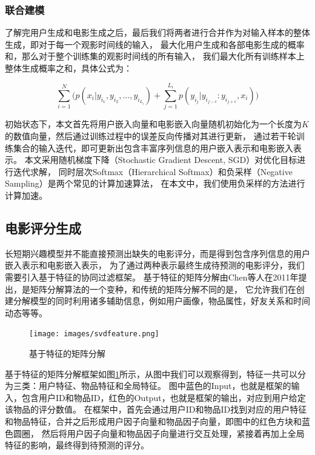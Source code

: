 \subsubsection{联合建模}
了解完用户生成和电影生成之后，最后我们将两者进行合并作为对输入样本的整体生成，即对于每一个观影时间线的输入，
最大化用户生成和各部电影生成的概率和，那么对于整个训练集的观影时间线的所有输入，
我们最大化所有训练样本上整体生成概率之和，具体公式为：

\begin{equation}
\sum_{i=1}^{N} \bigg( p(x_i | y_{i_1}, y_{i_2}, ..., y_{i_{L_i}}) +
\sum_{j=1}^{L_i} p(y_{i_j} | y_{i_{j-c}} : y_{i_{j+c}}, x_i) \bigg)
\end{equation}

初始状态下，本文首先将用户嵌入向量和电影嵌入向量随机初始化为一个长度为$K$的数值向量，然后通过训练过程中的误差反向传播对其进行更新，
通过若干轮训练集合的输入迭代，即可更新出包含丰富序列信息的用户嵌入表示和电影嵌入表示。
本文采用随机梯度下降（Stochastic Gradient Descent, SGD）对优化目标进行迭代求解，
同时层次Softmax（Hierarchical Softmax）和负采样（Negative Sampling）是两个常见的计算加速算法，
在本文中，我们使用负采样的方法进行计算加速。

\subsection{电影评分生成}
长短期兴趣模型并不能直接预测出缺失的电影评分，而是得到包含序列信息的用户嵌入表示和电影嵌入表示，
为了通过两种表示最终生成待预测的电影评分，我们需要引入基于特征的协同过滤框架。
基于特征的矩阵分解由Chen等人\parencite{chen2011feature}在2011年提出，是矩阵分解算法的一个变种，和传统的矩阵分解不同的是，
它允许我们在创建分解模型的同时利用诸多辅助信息，例如用户画像，物品属性，好友关系和时间动态等等。

\begin{figure}[htbp]
    \centering
    \texttt{[image: images/svdfeature.png]}
    \caption{基于特征的矩阵分解}
    \label{fig:svdfeature}
\end{figure}

基于特征的矩阵分解框架如图\ref{fig:svdfeature}所示，从图中我们可以观察得到，特征一共可以分为三类：用户特征、物品特征和全局特征。
图中蓝色的Input，也就是框架的输入，包含用户ID和物品ID，红色的Output，也就是框架的输出，对应到用户给定该物品的评分数值。
在框架中，首先会通过用户ID和物品ID找到对应的用户特征和物品特征，合并之后形成用户因子向量和物品因子向量，即图中的红色方块和蓝色圆圈，
然后将用户因子向量和物品因子向量进行交互处理，紧接着再加上全局特征的影响，最终得到待预测的评分。

